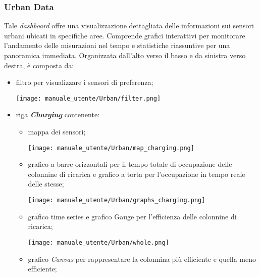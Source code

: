 \subsubsection{Urban Data}
Tale \textit{dashboard} offre una visualizzazione dettagliata delle informazioni sui sensori urbani ubicati in specifiche aree. Comprende grafici interattivi per monitorare l'andamento delle misurazioni nel tempo e statistiche riassuntive per una panoramica immediata. Organizzata dall'alto verso il basso e da sinistra verso destra, è composta da:
\begin{itemize}
    \item filtro per visualizzare i sensori di preferenza;
    \begin{center}
        \texttt{[image: manuale\_utente/Urban/filter.png]}
    \end{center}
    \item riga \textit{\textbf{Charging}} contenente:
    \begin{itemize}
        \item mappa dei sensori;
        \begin{center}
            \texttt{[image: manuale\_utente/Urban/map\_charging.png]}
        \end{center}
        \item grafico a barre orizzontali per il tempo totale di occupazione delle colonnine di ricarica e grafico a torta per l'occupazione in tempo reale delle stesse;
        \begin{center}
            \texttt{[image: manuale\_utente/Urban/graphs\_charging.png]}
        \end{center}
        \item grafico time series e grafico Gauge per l'efficienza delle colonnine di ricarica;
        \begin{center}
            \texttt{[image: manuale\_utente/Urban/whole.png]}
        \end{center}
        \item grafico \textit{Canvas} per rappresentare la colonnina più efficiente e quella meno efficiente;

\end{itemize}
\end{itemize}
